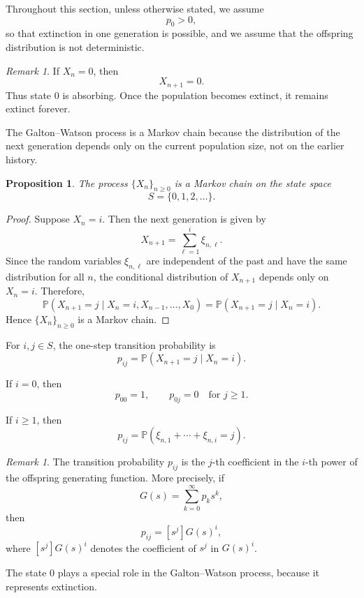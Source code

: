 \documentclass[11pt]{article}
\theoremstyle{plain}
\newtheorem{proposition}[theorem]{Proposition}
\theoremstyle{definition}
\theoremstyle{remark}
\newtheorem{remark}[theorem]{Remark}
\begin{document}
	Throughout this section, unless otherwise stated, we assume
	\[
	p_0>0,
	\]
	so that extinction in one generation is possible, and we assume that the offspring distribution is not deterministic.
	
	\begin{remark}
		If \(X_n=0\), then
		\[
		X_{n+1}=0.
		\]
		Thus state \(0\) is absorbing. Once the population becomes extinct, it remains extinct forever.
	\end{remark}
	
	
	The Galton--Watson process is a Markov chain because the distribution of the next generation depends only on the current population size, not on the earlier history.
	
	\begin{proposition}
		The process \(\{X_n\}_{n\ge 0}\) is a Markov chain on the state space
		\[
		S=\{0,1,2,\dots\}.
		\]
	\end{proposition}
	
	\begin{proof}
		Suppose \(X_n=i\). Then the next generation is given by
		\[
		X_{n+1}
		=
		\sum_{\ell=1}^{i}\xi_{n,\ell}.
		\]
		Since the random variables \(\xi_{n,\ell}\) are independent of the past and have the same distribution for all \(n\), the conditional distribution of \(X_{n+1}\) depends only on \(X_n=i\). Therefore,
		\[
		\mathbb{P}(X_{n+1}=j\mid X_n=i,X_{n-1},\dots,X_0)
		=
		\mathbb{P}(X_{n+1}=j\mid X_n=i).
		\]
		Hence \(\{X_n\}_{n\ge 0}\) is a Markov chain.
	\end{proof}
	
	For \(i,j\in S\), the one-step transition probability is
	\[
	p_{ij}
	=
	\mathbb{P}(X_{n+1}=j\mid X_n=i).
	\]
	
	If \(i=0\), then
	\[
	p_{00}=1,
	\qquad
	p_{0j}=0
	\quad\text{for }j\ge 1.
	\]
	
	If \(i\ge 1\), then
	\[
	p_{ij}
	=
	\mathbb{P}\left(\xi_{n,1}+\cdots+\xi_{n,i}=j\right).
	\]
	
	\begin{remark}
		The transition probability \(p_{ij}\) is the \(j\)-th coefficient in the \(i\)-th power of the offspring generating function. More precisely, if
		\[
		G(s)=\sum_{k=0}^{\infty}p_ks^k,
		\]
		then
		\[
		p_{ij}
		=
		[s^j]G(s)^i,
		\]
		where \([s^j]G(s)^i\) denotes the coefficient of \(s^j\) in \(G(s)^i\).
	\end{remark}
	
	
	The state \(0\) plays a special role in the Galton--Watson process, because it represents extinction.
	
\end{document}

